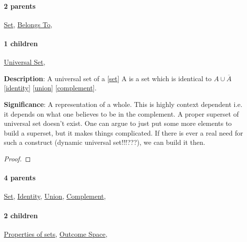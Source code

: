 \documentclass[../main.tex]{subfiles}
\begin{document}
\paragraph{2 parents} \hyperref[statement:Set]{Set}, \hyperref[statement:Belongs To]{Belongs To}, 
\paragraph{1 children} \hyperref[statement:Universal Set]{Universal Set}, 



\begin{statement}
\label{statement:Universal Set}\hspace*{0pt}\par
\end{statement}
\textbf{Description}:
A universal set of a [\hyperref[statement:Set]{set}] A is a set which is identical to $ A \cup \overline{A} $ [\hyperref[statement:Identity]{identity}] [\hyperref[statement:Union]{union}] [\hyperref[statement:Complement]{complement}].
\par
{\color{magenta} \textbf{Significance}:
A representation of a whole. This is highly context dependent i.e. it depends on what one believes to be in the complement.
A proper superset of universal set doesn't exist.
One can argue to just put some more elements to build a superset, but it makes things complicated.
If there is ever a real need for such a construct (dynamic universal set!!!???), we can build it then.
\par}
\begin{proof}
\proofbydefinition
\end{proof}\par
\paragraph{4 parents} \hyperref[statement:Set]{Set}, \hyperref[statement:Identity]{Identity}, \hyperref[statement:Union]{Union}, \hyperref[statement:Complement]{Complement}, 
\paragraph{2 children} \hyperref[statement:Properties of sets]{Properties of sets}, \hyperref[statement:Outcome Space]{Outcome Space}, 
\end{document}

